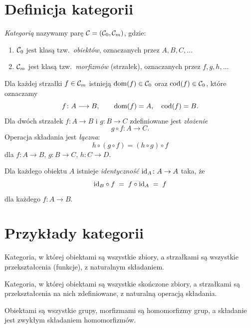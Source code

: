 \section{Definicja kategorii}

\begin{definicja}
\emph{Kategorią} nazywamy parę $\mathcal{C} = (\mathcal{C}_0, \mathcal{C}_m)$, gdzie:
\begin{enumerate}
\item $\mathcal{C}_0$ jest klasą tzw.\ \emph{obiektów}, oznaczanych przez $A, B, C, \ldots$
\item $\mathcal{C}_m$ jest klasą tzw.\ \emph{morfizmów} (strzałek), oznaczanych przez $f, g, h, \ldots$
\end{enumerate}
Dla każdej strzałki $f \in \mathcal{C}_m$ istnieją $\mathrm{dom}(f) \in \mathcal{C}_0$ oraz $\mathrm{cod}(f) \in \mathcal{C}_0$, które oznaczamy
\[
f \colon A \longrightarrow B, \qquad \mathrm{dom}(f) = A, \quad \mathrm{cod}(f) = B.
\]
Dla dwóch strzałek $f \colon A \to B$ i $g \colon B \to C$ zdefiniowane jest \emph{złożenie}
\[
g \circ f \colon A \longrightarrow C.
\]
Operacja składania jest \emph{łączna}:
\[
h \circ (g \circ f) = (h \circ g) \circ f
\]
dla $f \colon A \to B$, $g \colon B \to C$, $h \colon C \to D$.

Dla każdego obiektu $A$ istnieje \emph{identyczność} $\mathrm{id}_A \colon A \to A$ taka, że
\[
\mathrm{id}_B \circ f \;=\; f \circ \mathrm{id}_A \;=\; f
\]
dla każdego $f \colon A \to B$.
\end{definicja}

\section{Przykłady kategorii}

\begin{przyklad}[$\Set$]
Kategoria, w której obiektami są wszystkie zbiory, a strzałkami są wszystkie przekształcenia (funkcje), z naturalnym składaniem.
\end{przyklad}

\begin{przyklad}[$\Setf$]
Kategoria, w której obiektami są wszystkie skończone zbiory, a strzałkami są przekształcenia na nich zdefiniowane, z naturalną operacją składania.
\end{przyklad}

\begin{przyklad}
Obiektami są wszystkie grupy, morfizmami są homomorfizmy grup, a składanie jest zwykłym składaniem homomorfizmów.
\end{przyklad}

